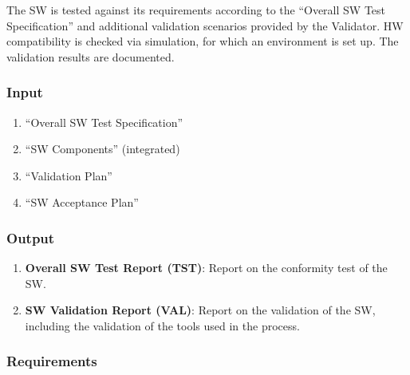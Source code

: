 \documentclass{template/openetcs_article}
\begin{document}
The SW is tested against its requirements according to the
``Overall SW Test Specification'' and additional validation scenarios
provided by the Validator. HW compatibility is checked via simulation, for which an
environment is set up. The validation results are documented.

\subsubsection{Input}
\label{sec:7-input}

\begin{enumerate}
\item ``Overall SW Test Specification''
\item ``SW Components'' (integrated)
\item ``Validation Plan''
\item ``SW Acceptance Plan''
\end{enumerate}

\subsubsection{Output}
\label{sec:7-output}

\begin{enumerate}
\item \textbf{Overall SW Test Report (TST)}: Report on the conformity
  test of the SW.
\item \textbf{SW Validation Report (VAL)}: Report on the validation of
  the SW, including the validation of the tools used in the process.
\end{enumerate}

\subsubsection{Requirements}
\label{sec:7-requirements}
\end{document}
